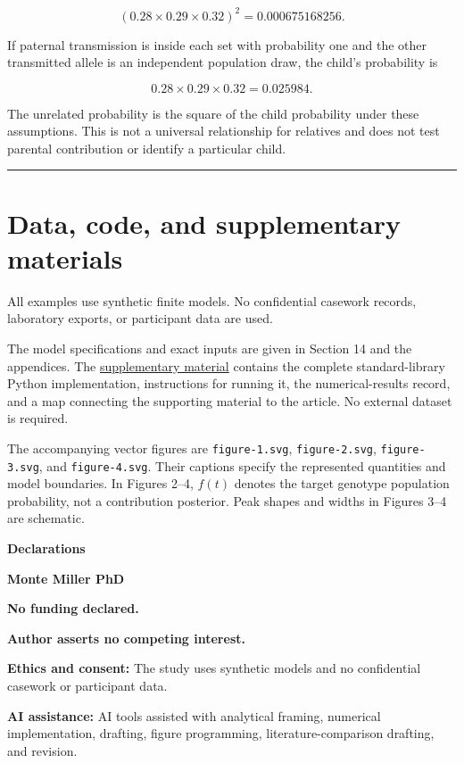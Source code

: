 \documentclass[
]{article}
\begin{document}
\[
(0.28\times0.29\times0.32)^2=0.000675168256.
\]

If paternal transmission is inside each set with probability one and the
other transmitted allele is an independent population draw, the child's
probability is

\[
0.28\times0.29\times0.32=0.025984.
\]

The unrelated probability is the square of the child probability under
these assumptions. This is not a universal relationship for relatives
and does not test parental contribution or identify a particular child.

\begin{center}\rule{0.5\linewidth}{0.5pt}\end{center}

\section{Data, code, and supplementary
materials}\label{data-code-and-supplementary-materials}

All examples use synthetic finite models. No confidential casework
records, laboratory exports, or participant data are used.

The model specifications and exact inputs are given in Section 14 and
the appendices. The \href{supplemental.md}{supplementary material}
contains the complete standard-library Python implementation,
instructions for running it, the numerical-results record, and a map
connecting the supporting material to the article. No external dataset
is required.

The accompanying vector figures are \texttt{figure-1.svg},
\texttt{figure-2.svg}, \texttt{figure-3.svg}, and \texttt{figure-4.svg}.
Their captions specify the represented quantities and model boundaries.
In Figures 2--4, \(f(t)\) denotes the target genotype population
probability, not a contribution posterior. Peak shapes and widths in
Figures 3--4 are schematic.

\textbf{Declarations}

\textbf{Monte Miller PhD}

\textbf{No funding declared.}

\textbf{Author asserts no competing interest.}

\textbf{Ethics and consent:} The study uses synthetic models and no
confidential casework or participant data.

\textbf{AI assistance:} AI tools assisted with analytical framing,
numerical implementation, drafting, figure programming,
literature-comparison drafting, and revision.
\end{document}
